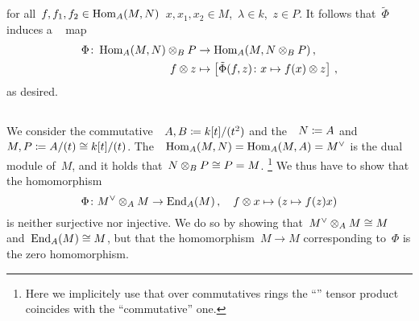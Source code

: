 for all~$f, f_1, f_2 \in \operatorname{Hom}_A(M,N)$~$x, x_1, x_2 \in M$,~$\lambda \in k$,~$z \in P$.
It follows that~$\tilde{\Phi}$ induces a {\welldef}~{\klin} map
\begin{align*}
            \Phi
   \colon   \operatorname{Hom}_A(M, N) \otimes_B P
  &\to      \operatorname{Hom}_A(M, N \otimes_B P) \,,
  \\
            f \otimes z
  &\mapsto  \left[
                      \tilde{\Phi}(f,z)
              \colon  x
              \mapsto f(x) \otimes z
            \right] \,,
\end{align*}
as desired.





\subsection{}

We consider the commutative~{\kalgs}~$A, B \coloneqq k[t]/(t^2)$ and the~{}~$N \coloneqq A$ and~$M, P \coloneqq A/(t) \cong k[t]/(t)$.
The~{}~$\operatorname{Hom}_A(M,N) = \operatorname{Hom}_A(M,A) = M^\vee$ is the dual module of~$M$, and it holds that~$N \otimes_B P \cong P = M$.%
\footnote{Here we implicitely use that over commutatives rings the \enquote{} tensor product coincides with the \enquote{commutative} one.}
We thus have to show that the homomorphism
\[
          \Phi
  \colon  M^\vee \otimes_A M
  \to     \operatorname{End}_A(M) \,,
  \quad   f \otimes x
  \mapsto (z \mapsto f(z) x)
\]
is neither surjective nor injective.
We do so by showing that~$M^\vee \otimes_A M \cong M$ and~$\operatorname{End}_A(M) \cong M$, but that the homomorphism~$M \to M$ corresponding to~$\Phi$ is the zero homomorphism.

